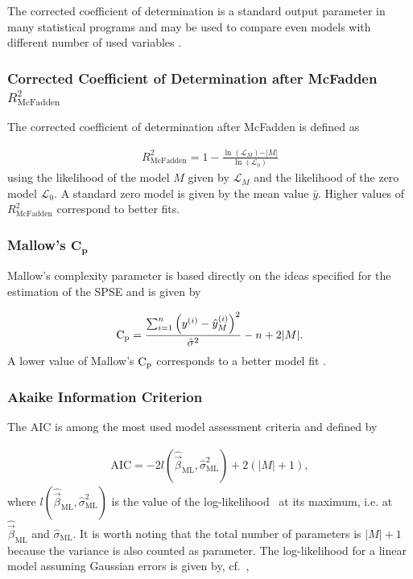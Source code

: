 The corrected coefficient of determination is a standard output parameter in many statistical programs and may be used to compare even models with different number of used variables \cite{fahrmeir2007regression}.

\subsubsection{Corrected Coefficient of Determination after McFadden $R_{\mathrm{McFadden}}^2$}

The corrected coefficient of determination after McFadden is defined as

\begin{align}
	R_{\mathrm{McFadden}}^2 = 1 - \frac{\ln{(\mathcal{L}_M)} - \vert M \vert }{\ln{(\mathcal{L}_0)}}
\end{align}
%
using the likelihood of the model $M$ given by $\mathcal{L}_M$ and the likelihood of the zero model $\mathcal{L}_0$. A standard zero model is given by the mean value $\bar y$. Higher values of $R_{\mathrm{McFadden}}^2$ correspond to better fits.

\subsubsection{Mallow's $\mathbf{C_p}$}

Mallow's complexity parameter is based directly on the ideas specified for the estimation of the SPSE and is given by

\begin{align}
	\text C_\mathrm{p} = \frac{\sum_{i=1}^n \left(y^{(i)} - \hat y^{(i)}_M\right)^2}{\hat \sigma^2} - n + 2 \vert M \vert.
\end{align}
%
A lower value of Mallow's $\text C_\mathrm{p}$ corresponds to a better model fit \cite{fahrmeir2007regression}.

\subsubsection{Akaike Information Criterion}

The AIC is among the most used model assessment criteria and defined by

\begin{align}
	\text{AIC} = -2 l(\hat{\vec{\beta}}_{\mathrm{ML}}, \hat \sigma^2_{\mathrm{ML}}) + 2(\vert M \vert +1),
\end{align}
%
where $l(\hat{\vec{\beta}}_{\mathrm{ML}}, \hat \sigma^2_{\mathrm{ML}})$ is the value of the log-likelihood~ at its maximum, i.e. at $\hat{\vec{\beta}}_{\mathrm{ML}}$ and $\hat{\sigma}_{\mathrm{ML}}$. It is worth noting that the total number of parameters is $\vert M \vert + 1$ because the variance is also counted as parameter. The log-likelihood for a linear model assuming Gaussian errors is given by, cf.~,

